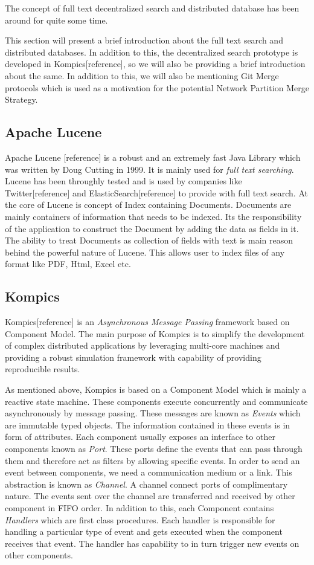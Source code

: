 \documentclass[a4paper, 11pt]{article}
\begin{document}
The concept of full text decentralized search and distributed database has been around for quite some time. 


This section will present a brief introduction about the full text search and distributed databases. In addition to this, the decentralized search prototype is developed in Kompics[reference], so we will also be providing a brief introduction about the same. In addition to this, we will also be mentioning Git Merge protocols which is used as a motivation for the potential Network Partition Merge Strategy.


\subsection*{Apache Lucene}

Apache Lucene [reference] is a robust and an extremely fast Java Library which was written by Doug Cutting in 1999. It is mainly used for \textit{full text searching}. Lucene has been throughly tested and is used by companies like Twitter[reference] and ElasticSearch[reference] to provide with full text search. At the core of Lucene is concept of Index containing Documents. Documents are mainly containers of information that needs to be indexed. Its the responsibility of the application to construct the Document by adding the data as fields in it. The ability to treat Documents as collection of fields with text is main reason behind the powerful nature of Lucene. This allows user to index files of any format like PDF, Html, Excel etc. 

\subsection*{Kompics}
Kompics[reference] is an \textit{Asynchronous Message Passing} framework based on Component Model. The main purpose of Kompics is to simplify the development of complex distributed applications by leveraging multi-core machines and providing a robust simulation framework with capability of providing reproducible results. 
\par As mentioned above, Kompics is based on a Component Model which is mainly a reactive state machine. These components execute concurrently and communicate asynchronously by message passing. These messages are known as \textit{Events} which are immutable typed objects. The information contained in these events is in form of attributes. Each component usually exposes an interface to other components known as \textit{Port}. These ports define the events that can pass through them and therefore act as filters by allowing specific events. In order to send an event between components, we need a communication medium or a link. This abstraction is known as \textit{Channel}. A channel connect ports of complimentary nature. The events sent over the channel are transferred and received by other component in FIFO order. In addition to this, each Component contains \textit{Handlers} which are first class procedures. Each handler is responsible for handling a particular type of event and gets executed when the component receives that event. The handler has capability to in turn trigger new events on other components. 
\end{document}
